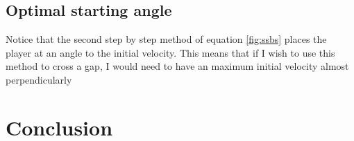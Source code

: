 
\subsection{Optimal starting angle}
Notice that the second step by step method of equation \ref{fig:ssbs} places the player at an angle to the initial velocity. This means that if I wish to use this method to cross a gap, I would need to have an maximum initial velocity almost perpendicularly



\section{Conclusion}


